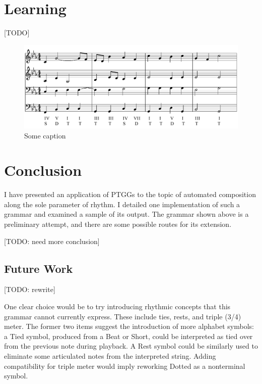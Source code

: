 \documentclass{article}
\begin{document}
\section{Learning}

[TODO]

\begin{figure}[h]
\centering
\includegraphics[width=0.9\columnwidth]{Chorale_443576165_minor.pdf}
\caption{Some caption}
\end{figure}


\section{Conclusion}

I have presented an application of PTGGs to the topic of automated composition along the sole parameter of rhythm. I detailed one implementation of such a grammar and examined a sample of its output. The grammar shown above is a preliminary attempt, and there are some possible routes for its extension. 

[TODO: need more conclusion]

\subsection{Future Work}

[TODO: rewrite]

One clear choice would be to try introducing rhythmic concepts that this grammar cannot currently express. These include ties, rests, and triple (3/4) meter. The former two items suggest the introduction of more alphabet symbols: a Tied symbol, produced from a Beat or Short, could be interpreted as tied over from the previous note during playback. A Rest symbol could be similarly used to eliminate some articulated notes from the interpreted string. Adding compatibility for triple meter would imply reworking Dotted as a nonterminal symbol.
\end{document}
